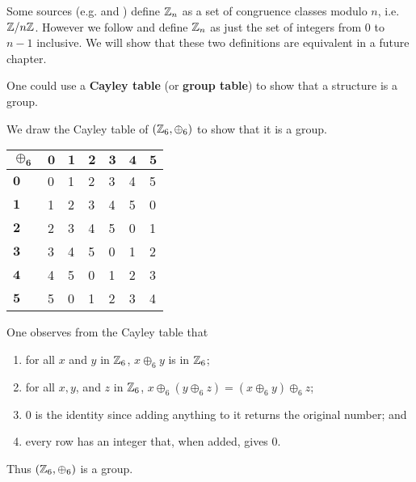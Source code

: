 \begin{remark}
    Some sources (e.g. {\cite[\S 33]{clark_1984}} and {\cite[Proposition 2.31]{humphreys_1996}}) define $\mathbb{Z}_n$ as a set of congruence classes modulo $n$, i.e. $\mathbb{Z}/n\mathbb{Z}$. However we follow \cite[p.~42]{gallian_2016} and define $\mathbb{Z}_n$ as just the set of integers from 0 to $n - 1$ inclusive. We will show that these two definitions are equivalent in a future chapter.
\end{remark}

One could use a \textbf{Cayley table} (or \textbf{group table}) to show that a structure is a group.
\begin{example}
    We draw the Cayley table of $(\mathbb{Z}_6, \oplus_6)$ to show that it is a group.
    \begin{table}[h]
        \centering
        \begin{tabular}{|l|l|l|l|l|l|l|}
        \hline
        $\boldsymbol{\oplus_6}$ & $\boldsymbol{0}$ & $\boldsymbol{1}$ & $\boldsymbol{2}$ & $\boldsymbol{3}$ & $\boldsymbol{4}$ & $\boldsymbol{5}$ \\ \hline
        $\boldsymbol{0}$          & 0          & 1          & 2          & 3          & 4          & 5          \\ \hline
        $\boldsymbol{1}$          & 1          & 2          & 3          & 4          & 5          & 0          \\ \hline
        $\boldsymbol{2}$          & 2          & 3          & 4          & 5          & 0          & 1          \\ \hline
        $\boldsymbol{3}$          & 3          & 4          & 5          & 0          & 1          & 2          \\ \hline
        $\boldsymbol{4}$          & 4          & 5          & 0          & 1          & 2          & 3          \\ \hline
        $\boldsymbol{5}$          & 5          & 0          & 1          & 2          & 3          & 4          \\ \hline
        \end{tabular}
    \end{table}

    One observes from the Cayley table that
    \begin{enumerate}
        \item for all $x$ and $y$ in $\mathbb{Z}_6$, $x \oplus_6 y$ is in $\mathbb{Z}_6$;
        \item for all $x, y$, and $z$ in $\mathbb{Z}_6$, $x \oplus_6 (y \oplus_6 z) = (x \oplus_6 y) \oplus_6 z$;
        \item 0 is the identity since adding anything to it returns the original number; and
        \item every row has an integer that, when added, gives 0.
    \end{enumerate}
    Thus $(\mathbb{Z}_6, \oplus_6)$ is a group.
\end{example}

